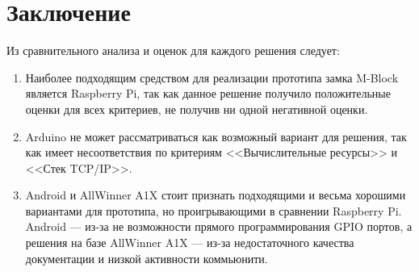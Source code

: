 \section{Заключение}
Из сравнительного анализа и оценок для каждого решения следует:

\begin{enumerate}

\item Наиболее подходящим средством для реализации прототипа замка M-Block является Raspberry Pi, так как данное решение получило положительные оценки для всех критериев, не получив ни одной негативной оценки. 

\item Arduino не может рассматриваться как возможный вариант для решения, так как имеет несоответствия по критериям <<Вычислительные ресурсы>> и <<Стек TCP/IP>>. 

\item Android и AllWinner A1X стоит признать подходящими и весьма хорошими вариантами для прототипа, но проигрывающими в сравнении Raspberry Pi. Android --- из-за не возможности прямого программирования GPIO портов, а решения на базе AllWinner A1X --- из-за недостаточного качества документации и низкой активности коммьюнити.

\end{enumerate}


